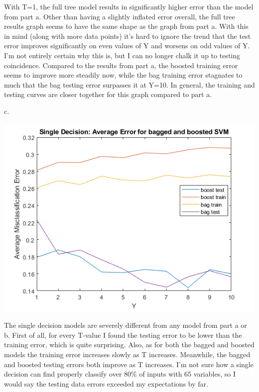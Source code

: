 \documentclass{article}
\begin{document}
\noindent
With T=1, the full tree model results in significantly higher error than the model from part a. Other than having a slightly inflated error overall, the full tree results graph seems to have the same shape as the graph from part a. With this in mind (along with more data points) it's hard to ignore the trend that the test error improves significantly on even values of Y and worsens on odd values of Y. I'm not entirely certain why this is, but I can no longer chalk it up to testing coincidence. Compared to the results from part a, the boosted training error seems to improve more steadily now, while the bag training error stagnates to much that the bag testing error surpasses it at Y=10. In general, the training and testing curves are closer together for this graph compared to part a.

\medskip
\noindent
c.

\begin{center}
    \includegraphics[scale=1]{c.png}
\end{center}

\noindent 
The single decision models are severely different from any model from part a or b. First of all, for every T-value I found the testing error to be lower than the training error, which is quite surprising. Also, as for both the bagged and boosted models the training error increases slowly as T increases. Meanwhile, the bagged and boosted testing errors both improve as T increases. I'm not sure how a single decision can find properly classify over 80\% of inputs with 65 variables, so I would say the testing data errors exceeded my expectations by far.
\end{document}
